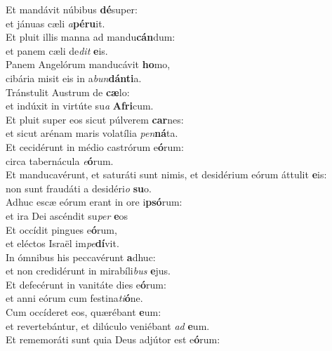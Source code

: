 \oddverse Et mandávit núbibus \textbf{dé}super:~\*\\
\oddverse et jánuas cæli \textit{a}\textbf{pé}\textbf{ru}it.\\
\evenverse Et pluit illis manna ad mandu\textbf{cán}dum:~\*\\
\evenverse et panem cæli de\textit{dit} \textbf{e}is.\\
\oddverse Panem Angelórum manducávit \textbf{ho}mo,~\*\\
\oddverse cibária misit eis in a\textit{bun}\textbf{dán}\textbf{ti}a.\\
\evenverse Tránstulit Austrum de \textbf{cæ}lo:~\*\\
\evenverse et indúxit in virtúte su\textit{a} \textbf{A}\textbf{fri}cum.\\
\oddverse Et pluit super eos sicut púlverem \textbf{car}nes:~\*\\
\oddverse et sicut arénam maris volatília \textit{pen}\textbf{ná}ta.\\
\evenverse Et cecidérunt in médio castrórum e\textbf{ó}rum:~\*\\
\evenverse circa tabernácula \textit{e}\textbf{ó}rum.\\
\oddverse Et manducavérunt, et saturáti sunt nimis, et desidérium eórum áttulit \textbf{e}is:~\*\\
\oddverse non sunt fraudáti a desidéri\textit{o} \textbf{su}o.\\
\evenverse Adhuc escæ eórum erant in ore i\textbf{psó}rum:~\*\\
\evenverse et ira Dei ascéndit su\textit{per} \textbf{e}os\\
\oddverse Et occídit pingues e\textbf{ó}rum,~\*\\
\oddverse et eléctos Israël im\textit{pe}\textbf{dí}vit.\\
\evenverse In ómnibus his peccavérunt \textbf{a}dhuc:~\*\\
\evenverse et non credidérunt in mirabíli\textit{bus} \textbf{e}jus.\\
\oddverse Et defecérunt in vanitáte dies e\textbf{ó}rum:~\*\\
\oddverse et anni eórum cum festina\textit{ti}\textbf{ó}ne.\\
\evenverse Cum occíderet eos, quærébant \textbf{e}um:~\*\\
\evenverse et revertebántur, et dilúculo veniébant \textit{ad} \textbf{e}um.\\
\oddverse Et rememoráti sunt quia Deus adjútor est e\textbf{ó}rum:~\*\\
